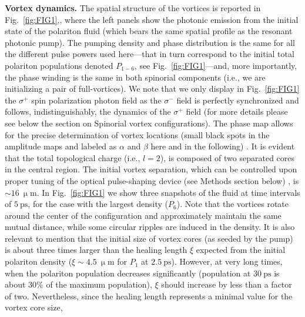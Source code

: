 \documentclass[aps,prb,twocolumn,superscriptaddress,nofootinbib]{revtex4}
\def\editr#1{#1}
\def\refer#1{#1}
\def\edstrike#1{}
\begin{document}
\noindent \textbf{Vortex dynamics.}
%
The spatial structure of the vortices is reported in Fig.~\ref{fig:FIG1},,
where the left panels show the photonic emission from the initial state of the polariton fluid
\refer{(which bears the same spatial profile as the resonant photonic pump)}.
The pumping density and phase distribution is the same for all the
different pulse powers used here---that in turn correspond to the initial total
polariton populations denoted $P_{1-6}$,
see Fig.~\ref{fig:FIG1}---and, more importantly, the phase winding is
the same in \editr{both} \edstrike{the} spinorial components \editr{(i.e., we are initializing a pair of full-vortices)}.
We note that we
only display in Fig.~\ref{fig:FIG1}
the $\sigma^+$ spin polarization photon field as
the $\sigma^-$ field is perfectly synchronized and follows, indistinguishably, the dynamics of
the $\sigma^+$ field 
(\editr{for more details please see below the section on Spinorial vortex configurations}\edstrike{for instance Fig.~\ref{fig:FIG4}\text{a--c}}).
%
The phase map allows for the precise determination of vortex locations
(small black spots in the amplitude maps \editr{and labeled as $\alpha$ and $\beta$ here and in the following})
\edstrike{, inside any of the two spin populations (denoted as $\sigma \equiv \text{ SAM}=\pm1$,
spin angular momentum)}.
%
It is evident that the total topological charge
(i.e., \edstrike{the orbital angular momentum per polariton, $l \equiv \text{ OAM}$} \editr{$l=2$}),
is composed of two separated cores in the central
region.
%
The initial vortex separation, which can be controlled upon proper tuning of the
optical \editr{pulse-shaping device (see Methods section below)} \edstrike{phase-shaping}, is $\sim16~\upmu\text{m}$.
%
In Fig.~\ref{fig:FIG1} we show three snapshots of the fluid  at time intervals of $5~\text{ps}$,
for the case with the largest density ($P_6$).
%
Note that the vortices
rotate around the center of the configuration
and approximately maintain the same mutual distance,
while some circular
ripples are induced in the density.
%
It is also relevant to mention that the initial size of vortex cores (as seeded by the pump)
is about three times larger than
the healing length $\xi$
expected from 
the initial polariton density ($\xi \sim 4.5~\upmu\text{m}$ for $P_1$ at $2.5~\text{ps}$).
However, at very long times, when the polariton population decreases significantly
(population at $30~\text{ps}$ is about $30\%$ of the maximum population), 
$\xi$ should increase by less than a factor of two.
Nevertheless, since the healing length represents a \editr{minimal} value for the vortex core size,
\end{document}
